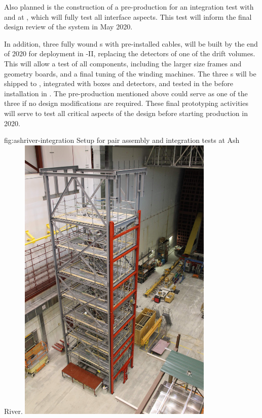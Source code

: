 Also planned is the construction of a pre-production  for an integration test with  and  at , which will fully test all interface aspects. This test will inform the final design review of the  system in May 2020. 

In addition, three fully wound s with pre-installed  cables, will be built by the end of 2020 for deployment in -II, replacing the detectors of one of the drift volumes.  This will allow a test of all  components, including the larger size frames and geometry boards, and a final tuning of the winding machines. The three s will be shipped to , integrated with  boxes and  detectors, and tested in the \coldbox before installation in .  The pre-production  mentioned above could serve as one of the three if no design modifications are required.  These final prototyping activities will serve to test all critical aspects of the  design before starting   production in 2020.  

\begin{dunefigure}{fig:ashriver-integration}
{Setup for  pair assembly and integration tests at Ash River.}
\includegraphics[width=0.7\textwidth]{graphics/sp-apa-ash-river-ladder.jpg} 
\end{dunefigure}